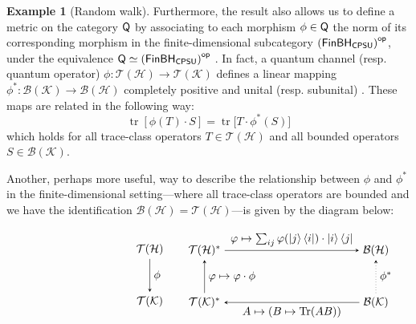 \documentclass[10pt,a4paper]{amsart}
\theoremstyle{definition}
\theoremstyle{definition}
\newtheorem{example}[definition]{Example}
\theoremstyle{definition}
\theoremstyle{definition}
\theoremstyle{definition}
\theoremstyle{definition}
\begin{document}
\begin{example}[Random walk]
Furthermore, the result also allows us to define a metric on the category $\mathsf{Q}$ by associating to each morphism $\phi \in \mathsf{Q}$ the norm of its corresponding morphism in the finite-dimensional subcategory $\left(\mathsf{FinBH_{CPSU}}\right)^{\mathsf{op}}$, under the equivalence $\mathsf{Q} \simeq \left(\mathsf{FinBH_{CPSU}}\right)^{\mathsf{op}}$ \cite{choSemanticsQuantumProgramming2016}. In fact, a quantum channel (resp. quantum operator) $\phi: \mathcal{T}(\mathcal{H})  \to \mathcal{T}(\mathcal{K})$ defines a linear mapping 
$\phi^*: \mathcal{B}(\mathcal{K}) \to \mathcal{B}(\mathcal{H})$ completely positive and unital (resp. subunital) 
\cite[4.1.2]{heinosaariMathematicalLanguageQuantum2011}. These maps are related in the following way:
\begin{equation*}
\operatorname{tr}[\phi(T) \cdot S] = \operatorname{tr}\big[T \cdot \phi^*(S)\big]
\end{equation*}
which holds for all trace-class operators $T \in \mathcal{T}(\mathcal{H})$ and all bounded operators $S \in \mathcal{B}(\mathcal{K})$.

Another, perhaps more useful, way to describe the relationship between $\phi$ and $\phi^*$ in the finite-dimensional setting—where all trace-class operators are bounded and we have the identification \( \mathcal{B}(\mathcal{H}) = \mathcal{T}(\mathcal{H}) \)—is given by the diagram below:

\[
\begin{minipage}{0.45\textwidth}
\centering
\begin{tikzpicture}
  \matrix (m) [matrix of math nodes,row sep=3em,column sep=2em,minimum width=1em]
  { 
    \mathcal{T}(\mathcal{H}) \\
     \mathcal{T}(\mathcal{K})  \\
  };
  \path[-stealth]
    (m-1-1) edge  node [right] {$\phi$} (m-2-1);
\end{tikzpicture}
\end{minipage}
\hspace{-50pt}
\begin{minipage}{0.45\textwidth}
\centering
\begin{tikzpicture}
  \matrix (m) [matrix of math nodes,row sep=3em,column sep=12em,minimum width=1em]
  {
  \mathcal{T}(\mathcal{H})^*&  \mathcal{B}(\mathcal{H})  \\
   \mathcal{T}(\mathcal{K})^* &  \mathcal{B}(\mathcal{K}) \\
  };
  \path[-stealth]
    (m-1-1) edge  node [above] {$\varphi \mapsto \sum_{ij} \varphi(\ket{j}\bra{i}) \cdot \ket{i} \bra{j}  $} (m-1-2)
    (m-2-2) edge [dotted]  node [right] {$\phi^*$} (m-1-2)
    (m-2-2) edge  node [below] {$ A \mapsto (B \mapsto \tr(AB)) $} (m-2-1)
    (m-2-1) edge  node [right] {$ \varphi \mapsto \varphi \cdot \phi $} (m-1-1)
    ;
\end{tikzpicture}
\end{minipage}
\]



\end{example}
\end{document}
